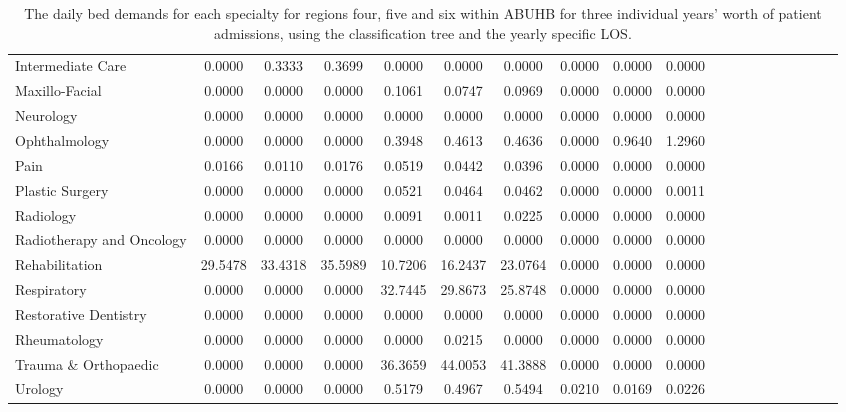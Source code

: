 \documentclass[thesis.tex]{subfiles}
\begin{document}
\begin{landscape}
\begin{table}[h!]
{\begin{tabular}{lcccccccccccccccccc}
Intermediate Care&	0.0000&	0.3333&	0.3699&	0.0000&	0.0000&	0.0000&	0.0000&	0.0000&	0.0000\\
Maxillo-Facial&	0.0000&	0.0000&	0.0000&	0.1061&	0.0747&	0.0969&	0.0000&	0.0000&	0.0000\\
Neurology&	0.0000&	0.0000&	0.0000&	0.0000&	0.0000&	0.0000&	0.0000&	0.0000&	0.0000\\
Ophthalmology&	0.0000&	0.0000&	0.0000&	0.3948&	0.4613&	0.4636&	0.0000&	0.9640&	1.2960\\
Pain&	0.0166&	0.0110&	0.0176&	0.0519&	0.0442&	0.0396&	0.0000&	0.0000&	0.0000\\
Plastic Surgery&	0.0000&	0.0000&	0.0000&	0.0521&	0.0464&	0.0462&	0.0000&	0.0000&	0.0011\\
Radiology&	0.0000&	0.0000&	0.0000&	0.0091&	0.0011&	0.0225&	0.0000&	0.0000&	0.0000\\
Radiotherapy and Oncology&	0.0000&	0.0000&	0.0000&	0.0000&	0.0000&	0.0000&	0.0000&	0.0000&	0.0000\\
Rehabilitation&	29.5478&	33.4318&	35.5989&	10.7206&	16.2437&	23.0764&	0.0000&	0.0000&	0.0000\\
Respiratory&	0.0000&	0.0000&	0.0000&	32.7445&	29.8673&	25.8748&	0.0000&	0.0000&	0.0000\\
Restorative Dentistry&	0.0000&	0.0000&	0.0000&	0.0000&	0.0000&	0.0000&	0.0000&	0.0000&	0.0000\\
Rheumatology&	0.0000&	0.0000&	0.0000&	0.0000&	0.0215&	0.0000&	0.0000&	0.0000&	0.0000\\
Trauma \& Orthopaedic&	0.0000&	0.0000&	0.0000&	36.3659&	44.0053&	41.3888&	0.0000&	0.0000&	0.0000\\
Urology&	0.0000&	0.0000&	0.0000&	0.5179&	0.4967&	0.5494&	0.0210&	0.0169&	0.0226\\

\bottomrule
\end{tabular}  } 
\caption{The daily bed demands for each specialty for regions four, five and six within ABUHB for three individual years’ worth of patient admissions, using the classification tree and the yearly specific LOS.}
    \label{apptab:LinkedDemands10b}
\end{table}  
\end{landscape}
\end{document}
